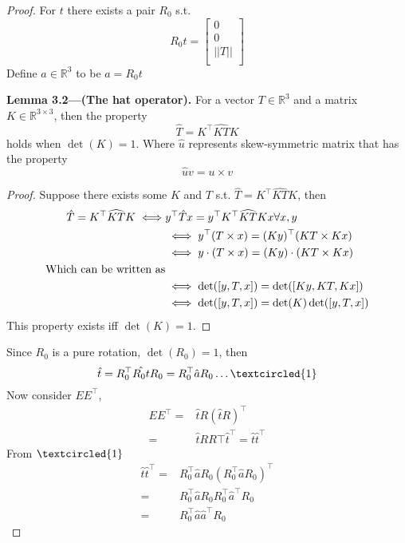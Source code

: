 \documentclass{article}
\begin{document}
\begin{proof}
    For $t$ there exists a pair $R_0$ s.t. 
$$R_0t = \begin{bmatrix} 0 \\ 0 \\ ||T||\\
\end{bmatrix}$$
Define $a\in\mathbb{R}^3$ to be $a=R_0t$
\begin{tcolorbox}[enhanced,breakable, sharp corners, colback=purple!5!white, colframe=purple!55!black, boxrule=0mm,top=0mm,bottom=0mm,leftrule=1mm, drop shadow=black!40!white]
    {\color{purple!55!black} \textbf{Lemma 3.2---(The hat operator).}} For a vector $T\in\mathbb{R}^3$ and a matrix $K\in\mathbb{R}^{3\times3}$, then the property $$\hat{T}=K^\top\widehat{KT}K$$
    holds when $\det(K)=1$. Where $\hat{u}$ represents skew-symmetric matrix that has the property  $$\hat{u}v = u\times v$$
\end{tcolorbox}

\begin{proof}
Suppose there exists some $K$ and $T$ s.t. $\hat{T}=K^\top\widehat{KT}K$, then
\begin{align*}
\hat{T}=K^\top\widehat{KT}K \iff & y^\top\hat{T}x=y^{\top}K^{\top}\widehat{KT}Kx \space \forall x, y\\
& \iff y^\top(T\times x)=(Ky)^\top(KT\times Kx)\\
& \iff y\cdot(T\times x)= (Ky)\cdot(KT\times Kx)\\
\text{Which can be written as}\\
& \iff \det([y, T, x])=\det([Ky, KT, Kx])\\
& \iff \det([y, T, x])=\det(K)\det([y, T,x])\\
\end{align*}
This property exists iff $\det(K)=1$.
\end{proof}
\vspace{0.5cm}
Since $R_0$ is a pure rotation, $\det(R_0)=1$, then
$$\hat{t} = R_0^\top\hat{R_0t}R_0=  R_0^\top\hat{a}R_0 \ldots \textcircled{1}$$
Now consider $EE^\top$,
\begin{align*}
    EE^\top =& \hat{t}R(\hat{t}R)^\top\\
    =& \hat{t}RR\top\hat{t}^\top = \hat{t}\hat{t}^\top
\end{align*}
From $\textcircled{1}$
\begin{align*}
    \hat{t}\hat{t}^\top=& R_0^\top\hat{a}R_0(R_0^\top\hat{a}R_0)^\top\\
    =& R_0^\top\hat{a}R_0R_0^\top\hat{a}^\top R_0\\
    =& R_0^\top\hat{a}\hat{a}^\top R_0
\end{align*}


\end{proof}
\end{document}
